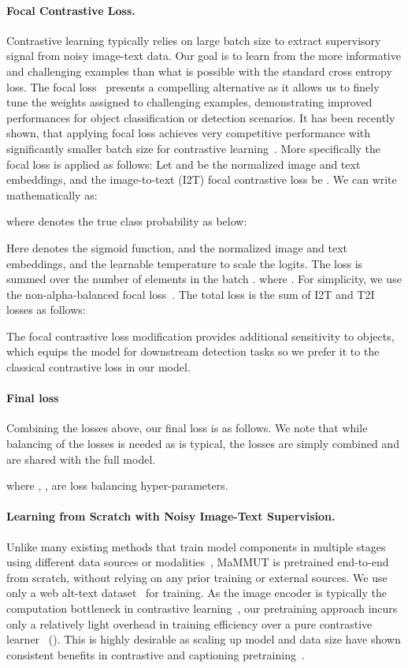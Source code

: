 \documentclass[10pt]{article} \usepackage[accepted]{tmlr}
\newcommand{\ours}{MaMMUT\xspace}
\begin{document}
\paragraph{Focal Contrastive Loss.}\quad
Contrastive learning typically relies on large batch size to extract supervisory signal from noisy image-text data. Our goal is to learn from the more informative and challenging examples than what is possible with the standard cross entropy loss. The focal loss~\citep{lin2017focal} presents a compelling alternative as it allows us to finely tune the weights assigned to challenging examples, demonstrating improved performances for object classification or detection scenarios. It has been recently shown, that applying focal loss achieves very competitive performance with significantly smaller batch size for contrastive learning~\citep{rovit}. More specifically the focal loss is applied as follows: Let  and  be the normalized image and text embeddings, and the image-to-text (I2T) focal contrastive loss be . We can write  mathematically as:

where  denotes the true class probability as below:

Here  denotes the sigmoid function,  and  the normalized image and text embeddings, and  the learnable temperature to scale the logits. The loss is summed over the number of elements in the batch .
where . For simplicity, we use the non-alpha-balanced focal loss~\citep{lin2017focal}. The total loss is the sum of I2T and T2I losses as follows:

The focal contrastive loss modification provides additional sensitivity to objects, which equips the model for downstream detection tasks so we prefer it to the classical contrastive loss in our model.

\paragraph{Final loss} \quad Combining the losses above, our final loss is as follows. We note that while balancing of the losses is needed as is typical, the losses are simply combined and are shared with the full model.

where , , are loss balancing hyper-parameters.


\paragraph{Learning from Scratch with Noisy Image-Text Supervision.}\quad Unlike many existing methods that train model components in multiple stages using different data sources or modalities~\citep{pali,flamingo,wang2022image,wang2022git}, \ours is pretrained end-to-end from scratch, without relying on any prior training or external sources. We use only a web alt-text dataset~\citep{align} for training. As the image encoder is typically the computation bottleneck in contrastive learning~\citep{radford2021clip}, our pretraining approach incurs only a relatively light overhead in training efficiency over a pure contrastive learner~\citep{radford2021clip} (). This is highly desirable as scaling up model and data size have shown consistent benefits in contrastive and captioning pretraining~\citep{radford2021clip,pali,flamingo}.
\end{document}
